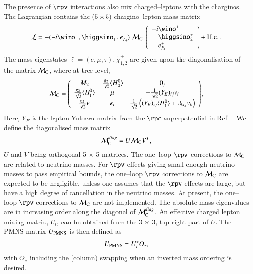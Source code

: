 \documentclass[pdflatex,final,3p,times]{elsarticle}
\begin{document}
The presence of $\rpv$ interactions also mix charged--leptons with the
charginos. The Lagrangian contains the ($5 \times 5$) chargino--lepton
mass matrix
\begin{eqnarray}
{\cal L}= - ( -i \wino^-, \higgsino_{1}^-, e_{L_j}^-
)
\; {\cal M}_{\rm C}\; \left ( \begin{array}{r@{}l}
 -i & \wino^+\\ &\higgsino_2^+ \\ &e_{R_k}^+ \\
 \end{array} \right ) + {\rm H.c.}\,.
\end{eqnarray}
The mass eigenstates $\ell=(e,\mu,\tau), \tilde{\chi}^\pm_{1,2}$ are
given upon the diagonalisation of the matrix ${\mathcal M}_{\rm C}$, where at
tree level,
\begin{eqnarray}
{\cal M}_{\rm C} = \left ( \begin{array}{ccc}
M_2  & \frac{g_2}{\sqrt{2}}\langle H_2^0 \rangle & 0_j  \\
 \frac{g_2}{\sqrt{2}}\langle H_1^0 \rangle  & \mu & -\frac{1}{\sqrt{2}}(Y_E)_{ij}v_i \\
\frac{g_2}{\sqrt{2}}v_i  & \kappa_i & \frac{1}{\sqrt{2}}\left((Y_E)_{ij} \langle H_1^0 \rangle+\lambda_{kij}v_k\right)\\
 \end{array}
\right ) , \label{chargino}
\end{eqnarray}
Here, $Y_E$ is the lepton Yukawa matrix from the $\rpc$
superpotential in Ref.~\cite{Allanach:2001kg}. We define the diagonalised mass
matrix 
\begin{eqnarray}
{\cal M}^{diag}_{\rm C}= U {\cal M}_{\rm C} V^T, \label{diagUV}
\end{eqnarray}
$U$ and $V$ being orthogonal 5 $\times$ 5 matrices.  
The one--loop $\rpv$ corrections to ${\cal M}_{\rm C}$ are related to neutrino
masses. For $\rpv$ effects giving small enough neutrino masses to pass
empirical bounds, the one--loop $\rpv$ corrections to ${\cal M}_{\rm C}$ are
expected to be negligible, unless one assumes that the $\rpv$ effects are
large, but have a high degree of cancellation in the neutrino masses. 
At present, the one--loop
$\rpv$ corrections to ${\cal M}_{\rm C}$ are not implemented.  The
  absolute mass eigenvalues are in increasing order along the diagonal
  of ${\cal M}^{diag}_{\rm C}$.  An effective charged lepton mixing
matrix, $U_l$, can be obtained from the 3 $\times$ 3, top right
part of $U$.  The PMNS matrix $U_{\rm PMNS}$ is then defined as
\begin{equation}\label{eq:upmns}
U_{\rm PMNS} = U_{l}^*O_{\nu},
\end{equation}
with $O_{\nu}$ including the (column) swapping when an inverted mass
ordering is desired.  
\end{document}
